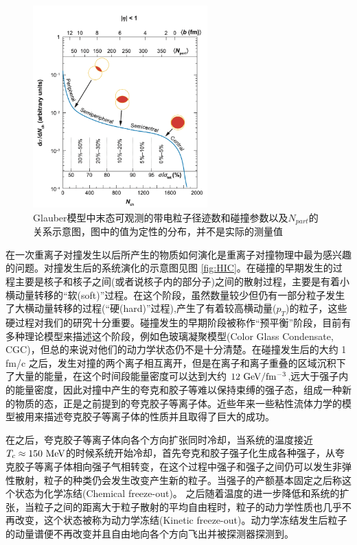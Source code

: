 \begin{figure}[htb]
    \begin{center}
    \includegraphics[width=0.6\textwidth,clip]{figures/Chapter1/Centrality.png}
    \end{center}
    \caption[中心度定义示意图]{Glauber模型中末态可观测的带电粒子径迹数和碰撞参数以及$N_{part}$的关系示意图，图中的值为定性的分布，并不是实际的测量值}
    \label{fig:Centrality}
\end{figure}

在一次重离子对撞发生以后所产生的物质如何演化是重离子对撞物理中最为感兴趣的问题。对撞发生后的系统演化的示意图见图 \ref{fig:HIC}。在碰撞的早期发生的过程主要是核子和核子之间(或者说核子内的部分子)之间的散射过程，主要是有着小横动量转移的“软(soft)”过程。在这个阶段，虽然数量较少但仍有一部分粒子发生了大横动量转移的过程(“硬(hard)”过程),产生了有着较高横动量($p_T$)的粒子，这些硬过程对我们的研究十分重要。碰撞发生的早期阶段被称作“预平衡”阶段，目前有多种理论模型来描述这个阶段，例如色玻璃凝聚模型(Color Glass Condensate, CGC)，但总的来说对他们的动力学状态仍不是十分清楚。在碰撞发生后的大约 1 fm/c 之后，发生对撞的两个离子相互离开，但是在离子和离子重叠的区域沉积下了大量的能量，在这个时间段能量密度可以达到大约 $12 {\rm~GeV/fm^{-3}}$,远大于强子内的能量密度，因此对撞中产生的夸克和胶子等难以保持束缚的强子态，组成一种新的物质的态，正是之前提到的夸克胶子等离子体。近些年来一些粘性流体力学的模型被用来描述夸克胶子等离子体的性质并且取得了巨大的成功。

在之后，夸克胶子等离子体向各个方向扩张同时冷却，当系统的温度接近$T_c \approx 150 {\rm~MeV}$的时候系统开始冷却，首先夸克和胶子强子化生成各种强子，从夸克胶子等离子体相向强子气相转变，在这个过程中强子和强子之间仍可以发生非弹性散射，粒子的种类仍会发生改变产生新的粒子。当强子的产额基本固定之后称这个状态为化学冻结(Chemical freeze-out)。 之后随着温度的进一步降低和系统的扩张，当粒子之间的距离大于粒子散射的平均自由程时，粒子的动力学性质也几乎不再改变，这个状态被称为动力学冻结(Kinetic freeze-out)。动力学冻结发生后粒子的动量谱便不再改变并且自由地向各个方向飞出并被探测器探测到。


